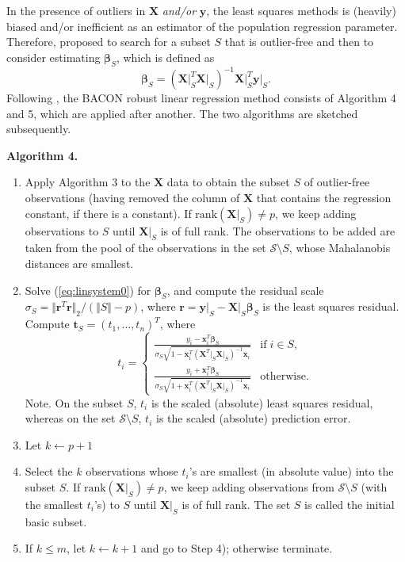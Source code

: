 \documentclass[a4paper,oneside,11pt,DIV=12]{scrartcl}
\begin{document}
In the presence of outliers in $\bm X$ \textit{and/or} $\bm y$, the
least squares methods is (heavily) biased and/or inefficient as an
estimator of the population regression parameter. Therefore,
\citet{billor_hadi_etal_2000} proposed to search for a subset $S$ that
is outlier-free and then to consider estimating $\bm \beta_S$, which
is defined as
\begin{equation}\label{eq:linsystem0}
	\bm \beta_S = (\bm X \vert_S^T \bm X \vert_S)^{-1}
		\bm X\vert_S^T \bm y\vert_S.
\end{equation}
\noindent Following \citet{billor_hadi_etal_2000}, the BACON robust
linear regression method consists of Algorithm 4 and 5, which are
applied after another. The two algorithms are sketched subsequently.

\vspace{1em}
\noindent \textbf{\sffamily Algorithm 4.}
\vspace{-0.5em}
\begin{enumerate}[Step 1)]
	\item Apply Algorithm 3 to the $\bm X$ data to obtain the subset
		$S$ of outlier-free observations (having removed the column of $\bm X$
		that contains the regression constant, if there is a constant).
		If $\mathrm{rank}(\bm X\vert_S) \neq p$, we keep adding observations
		to $S$ until $\bm X \vert_S$ is of full rank. The observations to be
		added are taken from the pool of the observations in the set
		$\mathscr{S} \setminus S$, whose Mahalanobis distances are smallest.
	\item Solve (\ref{eq:linsystem0}) for $\bm \beta_S$, and compute the
		residual scale
		$\sigma_S = \Vert \bm r^T \bm r \Vert_2 / (\Vert S\Vert - p)$, where
		$\bm r = \bm y \vert_S - \bm X\vert_S \bm \beta_S$ is the least
		squares residual. Compute $\bm t_S=(t_1, \ldots, t_n)^T$, where
		\begin{equation}\label{eq:tis0}
			t_i = \begin{cases}
				\displaystyle{\frac{y_i - \bm x_i^T \bm \beta_S}{\sigma_S
					\sqrt{1 - \bm x_i^T (\bm X^T \vert_S \bm X \vert_S)^{-1}
					\bm x_i}}} & \text{if} \; i \in S,\\
				\displaystyle{\frac{y_i + \bm x_i^T \bm \beta_S}{\sigma_S
					\sqrt{1 + \bm x_i^T (\bm X^T \vert_S \bm X \vert_S)^{-1}
					\bm x_i}}} & \text{otherwise}.
			\end{cases}
		\end{equation}
		Note. On the subset $S$, $t_i$ is the scaled (absolute) least
		squares residual, whereas on the set $\mathscr{S}\setminus S$, $t_i$
		is the scaled (absolute) prediction error.
	\item Let $k \gets p + 1$
	\item Select the $k$ observations whose $t_i$'s are smallest (in
		absolute value) into the subset $S$. If
		$\mathrm{rank}(\bm X \vert_S)\neq p$, we keep adding observations
		from $\mathscr{S} \setminus S$ (with the smallest $t_i$'s) to
		$S$ until $\bm X \vert_S$ is of full rank. The set $S$ is called
		the initial basic subset.
	\item If $k \leq m$, let $k \gets k + 1$ and go to Step 4); otherwise
		terminate.
\end{enumerate}
\end{document}

